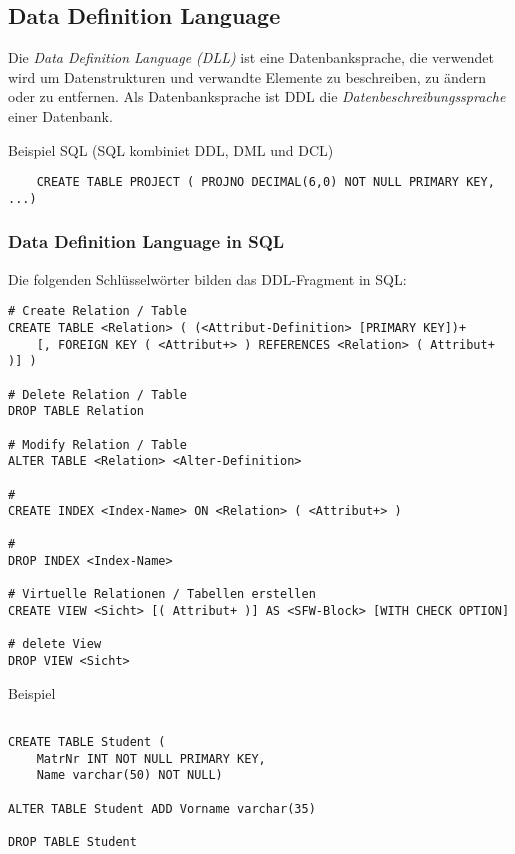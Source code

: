 \documentclass{scrbook}
\begin{document}
\subsection{Data Definition Language}

Die \emph{Data Definition Language (DLL)} ist eine Datenbanksprache,
die verwendet wird um Datenstrukturen und verwandte Elemente zu beschreiben, 
zu ändern oder zu entfernen.
Als Datenbanksprache ist DDL die \emph{Datenbeschreibungssprache} einer Datenbank.

Beispiel SQL (SQL kombiniet DDL, DML und DCL)

\begin{lstlisting}
    CREATE TABLE PROJECT ( PROJNO DECIMAL(6,0) NOT NULL PRIMARY KEY, ...)
\end{lstlisting}


\subsubsection{Data Definition Language in SQL}

Die folgenden Schlüsselwörter bilden das DDL-Fragment in SQL:

\begin{lstlisting}
# Create Relation / Table
CREATE TABLE <Relation> ( (<Attribut-Definition> [PRIMARY KEY])+
    [, FOREIGN KEY ( <Attribut+> ) REFERENCES <Relation> ( Attribut+ )] )

# Delete Relation / Table
DROP TABLE Relation

# Modify Relation / Table
ALTER TABLE <Relation> <Alter-Definition>

# 
CREATE INDEX <Index-Name> ON <Relation> ( <Attribut+> )

#
DROP INDEX <Index-Name>

# Virtuelle Relationen / Tabellen erstellen 
CREATE VIEW <Sicht> [( Attribut+ )] AS <SFW-Block> [WITH CHECK OPTION]

# delete View
DROP VIEW <Sicht>
\end{lstlisting}

Beispiel

\begin{lstlisting}

CREATE TABLE Student (
    MatrNr INT NOT NULL PRIMARY KEY,
    Name varchar(50) NOT NULL)

ALTER TABLE Student ADD Vorname varchar(35)

DROP TABLE Student
\end{lstlisting}
\end{document}
